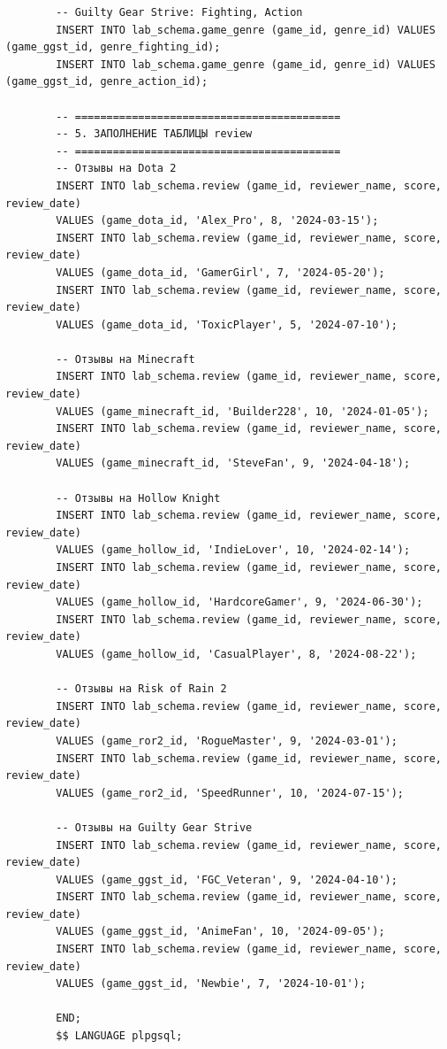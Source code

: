 \documentclass[oneside,a4paper,14pt]{extarticle}
\begin{document}
\begin{lstlisting}
		-- Guilty Gear Strive: Fighting, Action
		INSERT INTO lab_schema.game_genre (game_id, genre_id) VALUES (game_ggst_id, genre_fighting_id);
		INSERT INTO lab_schema.game_genre (game_id, genre_id) VALUES (game_ggst_id, genre_action_id);
		
		-- ==========================================
		-- 5. ЗАПОЛНЕНИЕ ТАБЛИЦЫ review
		-- ==========================================
		-- Отзывы на Dota 2
		INSERT INTO lab_schema.review (game_id, reviewer_name, score, review_date)
		VALUES (game_dota_id, 'Alex_Pro', 8, '2024-03-15');
		INSERT INTO lab_schema.review (game_id, reviewer_name, score, review_date)
		VALUES (game_dota_id, 'GamerGirl', 7, '2024-05-20');
		INSERT INTO lab_schema.review (game_id, reviewer_name, score, review_date)
		VALUES (game_dota_id, 'ToxicPlayer', 5, '2024-07-10');
		
		-- Отзывы на Minecraft
		INSERT INTO lab_schema.review (game_id, reviewer_name, score, review_date)
		VALUES (game_minecraft_id, 'Builder228', 10, '2024-01-05');
		INSERT INTO lab_schema.review (game_id, reviewer_name, score, review_date)
		VALUES (game_minecraft_id, 'SteveFan', 9, '2024-04-18');
		
		-- Отзывы на Hollow Knight
		INSERT INTO lab_schema.review (game_id, reviewer_name, score, review_date)
		VALUES (game_hollow_id, 'IndieLover', 10, '2024-02-14');
		INSERT INTO lab_schema.review (game_id, reviewer_name, score, review_date)
		VALUES (game_hollow_id, 'HardcoreGamer', 9, '2024-06-30');
		INSERT INTO lab_schema.review (game_id, reviewer_name, score, review_date)
		VALUES (game_hollow_id, 'CasualPlayer', 8, '2024-08-22');
		
		-- Отзывы на Risk of Rain 2
		INSERT INTO lab_schema.review (game_id, reviewer_name, score, review_date)
		VALUES (game_ror2_id, 'RogueMaster', 9, '2024-03-01');
		INSERT INTO lab_schema.review (game_id, reviewer_name, score, review_date)
		VALUES (game_ror2_id, 'SpeedRunner', 10, '2024-07-15');
		
		-- Отзывы на Guilty Gear Strive
		INSERT INTO lab_schema.review (game_id, reviewer_name, score, review_date)
		VALUES (game_ggst_id, 'FGC_Veteran', 9, '2024-04-10');
		INSERT INTO lab_schema.review (game_id, reviewer_name, score, review_date)
		VALUES (game_ggst_id, 'AnimeFan', 10, '2024-09-05');
		INSERT INTO lab_schema.review (game_id, reviewer_name, score, review_date)
		VALUES (game_ggst_id, 'Newbie', 7, '2024-10-01');
		
		END;
		$$ LANGUAGE plpgsql;
	\end{lstlisting}
	
\end{document}
